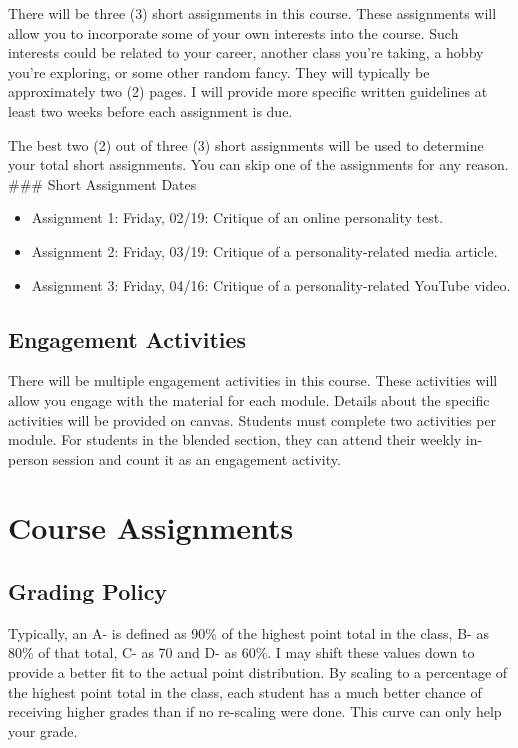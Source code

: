 \documentclass[11pt,]{article}
\begin{document}
There will be three (3) short assignments in this course. These
assignments will allow you to incorporate some of your own interests
into the course. Such interests could be related to your career, another
class you're taking, a hobby you're exploring, or some other random
fancy. They will typically be approximately two (2) pages. I will
provide more specific written guidelines at least two weeks before each
assignment is due.

The best two (2) out of three (3) short assignments will be used to
determine your total short assignments. You can skip one of the
assignments for any reason. \#\#\# Short Assignment Dates

\begin{itemize}
\item
  Assignment 1: Friday, 02/19: Critique of an online personality test.
\item
  Assignment 2: Friday, 03/19: Critique of a personality-related media
  article.
\item
  Assignment 3: Friday, 04/16: Critique of a personality-related YouTube
  video.
\end{itemize}

\hypertarget{engagement-activities}{%
\subsection{Engagement Activities}\label{engagement-activities}}

There will be multiple engagement activities in this course. These
activities will allow you engage with the material for each module.
Details about the specific activities will be provided on canvas.
Students must complete two activities per module. For students in the
blended section, they can attend their weekly in-person session and
count it as an engagement activity.

\hypertarget{course-assignments-1}{%
\section{Course Assignments}\label{course-assignments-1}}

\hypertarget{grading-policy}{%
\subsection{Grading Policy}\label{grading-policy}}

Typically, an A- is defined as 90\% of the highest point total in the
class, B- as 80\% of that total, C- as 70 and D- as 60\%. I may shift
these values down to provide a better fit to the actual point
distribution. By scaling to a percentage of the highest point total in
the class, each student has a much better chance of receiving higher
grades than if no re-scaling were done. This curve can only help your
grade.
\end{document}
